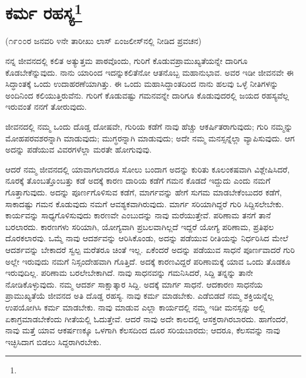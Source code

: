 
\chapter[ಕರ್ಮ ರಹಸ್ಯ]{ಕರ್ಮ ರಹಸ್ಯ\protect\footnote{}}

\begin{center}
(೧೯೦೦ರ ಜನವರಿ ೪ನೇ ತಾರೀಖು ಲಾಸ್ ಏಂಜಲೀಸ್‌ನಲ್ಲಿ ನೀಡಿದ ಪ್ರವಚನ)
\end{center}

ನನ್ನ ಜೀವನದಲ್ಲಿ ಕಲಿತ ಅತ್ಯುತ್ತಮ ಪಾಠವೊಂದು, ಗುರಿಗೆ ಕೊಡುವ\break ಪ್ರಾಮುಖ್ಯತೆಯನ್ನೇ ದಾರಿಗೂ ಕೊಡಬೇಕೆನ್ನುವುದು. ನಾನು ಯಾರಿಂದ ಇದನ್ನು\break ಕಲಿತೆನೋ ಆತನೊಬ್ಬ ಮಹಾನುಭಾವ. ಅವರ ಇಡೀ ಜೀವನವೇ ಈ ಸಿದ್ಧಾಂತಕ್ಕೆ ಒಂದು ಉದಾಹರಣೆಯಾಗಿತ್ತು. ಈ ಒಂದು ಮಹಾಸಿದ್ಧಾಂತದಿಂದ ನಾನು ಹಲವು ಒಳ್ಳೆ ನೀತಿಗಳನ್ನು ಅಂದಿನಿಂದ ಕಲಿಯುತ್ತಿರುವೆನು. ಗುರಿಗೆ ಕೊಡುವಷ್ಟು ಗಮನವನ್ನೇ ದಾರಿಗೂ ಕೊಡುವುದರಲ್ಲಿ ಜಯದ ರಹಸ್ಯವೆಲ್ಲ ಇರುವಂತೆ ನನಗೆ ತೋರುವುದು.

ಜೀವನದಲ್ಲಿ ನಮ್ಮ ಒಂದು ದೊಡ್ಡ ದೋಷವೇ, ಗುರಿಯ ಕಡೆಗೆ ನಾವು ಹೆಚ್ಚು ಆಕರ್ಷಿತರಾಗುವುದು; ಗುರಿ ನಮ್ಮನ್ನು ಮೋಹಪರವಶರನ್ನಾಗಿ ಮಾಡುವುದು; ಮುಗ್ಧರನ್ನಾಗಿ ಮಾಡುವುದು; ಅದೇ ನಮ್ಮ ಮನಸ್ಸನ್ನೆಲ್ಲಾ ವ್ಯಾಪಿಸುವುದು. ಆಗ ಅದನ್ನು ಪಡೆಯುವ ವಿವರಗಳೆಲ್ಲಾ ಮರತೇ ಹೋಗುವುವು.

ಆದರೆ ನಮ್ಮ ಜೀವನದಲ್ಲಿ ಯಾವಾಗಲಾದರೂ ಸೋಲು ಬಂದಾಗ ಅದನ್ನು ಕುರಿತು ಕೂಲಂಕಷವಾಗಿ ವಿಶ್ಲೇಷಿಸಿದರೆ, ನೂರಕ್ಕೆ ತೊಂಬತ್ತೊಂಬತ್ತು ಕಡೆ ಅದಕ್ಕೆ ಕಾರಣ ದಾರಿಯ ಕಡೆಗೆ ಗಮನ ಕೊಡದೆ ಇದ್ದುದು ಎಂದು ನಮಗೆ ಗೊತ್ತಾಗುವುದು. ಅದನ್ನು ಪೂರ್ಣಗೊಳಿಸುವ ಕಡೆಗೆ, ಮಾರ್ಗವನ್ನು ಹೇಗೆ ಸುಗಮ ಮಾಡಬೇಕೆಂಬುದರ ಕಡೆಗೆ, ಸಾಕಾದಷ್ಟು ಗಮನ ಕೊಡುವುದು ನಮಗೆ ಆವಶ್ಯಕವಾಗಿರುವುದು. ಮಾರ್ಗ ಸರಿಯಾಗಿದ್ದರೆ ಗುರಿ ಸಿದ್ದಿಸಲೇಬೇಕು. ಕಾರ್ಯವನ್ನು ಸಾಧ್ಯಗೊಳಿಸುವುದು ಕಾರಣವೇ ಎಂಬುದನ್ನು ನಾವು ಮರೆಯುತ್ತೇವೆ. ಪರಿಣಾಮ ತನಗೆ ತಾನೆ ಬರಲಾರದು. ಕಾರಣಗಳು ಸರಿಯಾಗಿ, ಯೋಗ್ಯವಾಗಿ ಪ್ರಬಲವಾಗಿಲ್ಲದೆ ಇದ್ದರೆ ಯೋಗ್ಯ ಪರಿಣಾಮ, ಪ್ರತಿಫಲ ದೊರಕಲಾರವು. ಒಮ್ಮೆ ನಾವು ಆದರ್ಶವನ್ನು ಆರಿಸಿಕೊಂಡು, ಅದನ್ನು ಪಡೆಯುವ ರೀತಿಯನ್ನು ನಿರ್ಧರಿಸಿದ ಮೇಲೆ ಆದರ್ಶವನ್ನು ಬೇಕಾದರೆ ಸ್ವಲ್ಪ ಮರೆತರೂ ಚಿಂತೆ ಇಲ್ಲ. ಏಕೆಂದರೆ ಅದನ್ನು ಪಡೆಯುವ ಸಾಧನೆ ಪೂರ್ಣವಾದರೆ ಗುರಿ ಅಲ್ಲೇ ಇರುವುದು ನಮಗೆ ನಿಸ್ಸಂದೇಹವಾಗಿ ಗೊತ್ತಿದೆ. ಅದಕ್ಕೆ ಕಾರಣವಿದ್ದರೆ ಪರಿಣಾಮಕ್ಕೆ ಯಾವ ಒಂದು ತೊಡಕೂ ಇರುವುದಿಲ್ಲ. ಪರಿಣಾಮ ಬರಲೇಬೇಕಾಗಿದೆ. ನಾವು ಸಾಧನವನ್ನು ಗಮನಿಸಿದರೆ, ಸಿದ್ದಿ ತನ್ನನ್ನು ತಾನೇ ನೋಡಿಕೊಳ್ಳುವುದು. ನಮ್ಮ ಆದರ್ಶ ಸಾಕ್ಷಾತ್ಕಾರ ಸಿದ್ದಿ. ಅದಕ್ಕೆ ಮಾರ್ಗ ಸಾಧನೆ. ಆದಕಾರಣ ಸಾಧನೆಯ ಪ್ರಾಮುಖ್ಯತೆಯೆ ಜೀವನದ ಅತಿ ದೊಡ್ಡ ರಹಸ್ಯ. ನಾವು ಕರ್ಮ ಮಾಡಬೇಕು. ಎಡೆಬಿಡದೆ ನಮ್ಮ ಶಕ್ತಿಯನ್ನೆಲ್ಲ ಉಪಯೋಗಿಸಿ ಕರ್ಮ ಮಾಡಬೇಕು. ನಾವು ಮಾಡುವ ಎಲ್ಲಾ ಕಾರ್ಯದಲ್ಲಿ ನಮ್ಮ ಇಡೀ ಮನಸ್ಸನ್ನು ಅಲ್ಲಿ ಏಕಾಗ್ರಮಾಡಬೇಕೆಂದು ಗೀತೆಯಲ್ಲಿ ಓದುತ್ತೇವೆ. ಆದರೆ ನಾವು ಅದೇ ಕಾಲದಲ್ಲಿ ಆಸಕ್ತರಾಗಿರಬಾರದು. ಹಾಗೆಂದರೆ, ನಾವು ಮತ್ತೆ ಯಾವ ಆಕರ್ಷಣಕ್ಕೂ ಒಳಗಾಗಿ ಕೆಲಸದಿಂದ ದೂರ ಸರಿಯಬಾರದು; ಆದರೂ, ಕೆಲಸವನ್ನು ನಾವು ಇಚ್ಛಿಸಿದಾಗ ಬಿಡಲು ಸಿದ್ದರಾಗಿರಬೇಕು.

